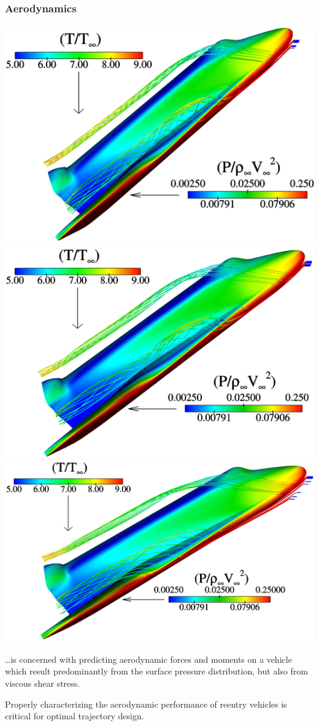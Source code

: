 \documentclass[compress,11pt]{beamer}
\begin{document}
\frame
{
  \vspace{-1em}
  \frametitle{\scriptsize Aerodynamics}
  \includegraphics[width=.33\textwidth]{figures/orbiter/side_view_a40}
  \includegraphics[width=.33\textwidth]{figures/orbiter/side_view_a35}
  \includegraphics[width=.33\textwidth]{figures/orbiter/side_view_a30}
  \vspace{1em}

  \ldots is concerned with predicting aerodynamic forces and moments on a vehicle which result predominantly from the surface pressure distribution, but also from viscous shear stress.
  \vspace{1em}

  Properly characterizing the aerodynamic performance of reentry vehicles is critical for optimal trajectory design.
}
 
\end{document}
